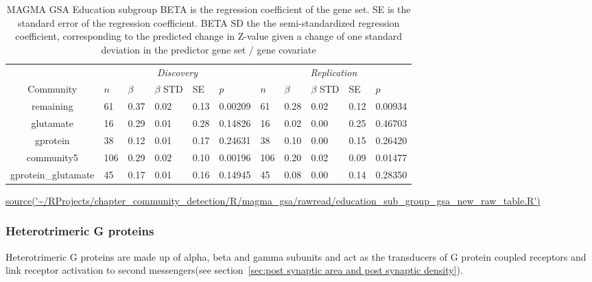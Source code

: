 \begin{table}[ht]
\centering
\begin{adjustbox}{width=\textwidth}

\setlength{\extrarowheight}{2pt}
\begin{tabular}{cllllllllll}
  \toprule
   &  \multicolumn{5}{c}{\textit{Discovery}} & \multicolumn{5}{c}{\textit{Replication}} \\
    \cmidrule{2-11}
Community & $n$ & $\beta$ & $\beta$ STD & SE & $p$ & $n$ & $\beta$ & $\beta$ STD & SE & $p$\\ 
  \midrule
remaining & 61 & 0.37 & 0.02 & 0.13 & 0.00209 & 61 & 0.28 & 0.02 & 0.12 & 0.00934 \\ 
  glutamate & 16 & 0.29 & 0.01 & 0.28 & 0.14826 & 16 & 0.02 & 0.00 & 0.25 & 0.46703 \\ 
  gprotein & 38 & 0.12 & 0.01 & 0.17 & 0.24631 & 38 & 0.10 & 0.00 & 0.15 & 0.26420 \\ 
  community5 & 106 & 0.29 & 0.02 & 0.10 & 0.00196 & 106 & 0.20 & 0.02 & 0.09 & 0.01477 \\ 
  gprotein\_glutamate & 45 & 0.17 & 0.01 & 0.16 & 0.14945 & 45 & 0.08 & 0.00 & 0.14 & 0.28350 \\ 
   \bottomrule
\end{tabular}
\end{adjustbox}
\caption{MAGMA GSA Education subgroup  BETA is the regression coefficient of the gene set. SE is the standard error of the regression coefficient. BETA SD the the semi-standardized regression coefficient, corresponding to the predicted
change in Z-value given a change of one standard deviation in the predictor gene set / gene covariate } 
\tiny\url{source('~/RProjects/chapter_community_detection/R/magma_gsa/rawread/education_sub_group_gsa_new_raw_table.R')}
\label{tab:MAGMA GSA Education sub}
\end{table}



\subsubsection{Heterotrimeric G proteins}
Heterotrimeric G proteins are made up of alpha, beta and gamma subunits and act as the transducers of G protein coupled receptors and link receptor activation to second messengers\cite{milligan2006heterotrimeric}(see section~\ref{sec:post synaptic area and post synaptic density}).

